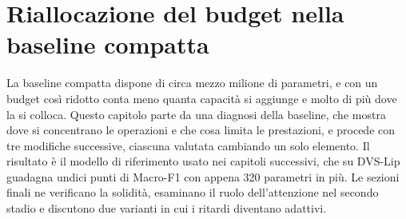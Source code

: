 \chapter{Riallocazione del budget nella baseline compatta}
\label{chap:riallocazione_budget}


La baseline compatta dispone di circa mezzo milione di parametri, e con un budget così ridotto conta meno quanta capacità si aggiunge e molto di più dove la si colloca. Questo capitolo parte da una diagnosi della baseline, che mostra dove si concentrano le operazioni e che cosa limita le prestazioni, e procede con tre modifiche successive, ciascuna valutata cambiando un solo elemento. Il risultato è il modello di riferimento usato nei capitoli successivi, che su DVS-Lip guadagna undici punti di Macro-F1 con appena 320 parametri in più. Le sezioni finali ne verificano la solidità, esaminano il ruolo dell'attenzione nel secondo stadio e discutono due varianti in cui i ritardi diventano adattivi.


